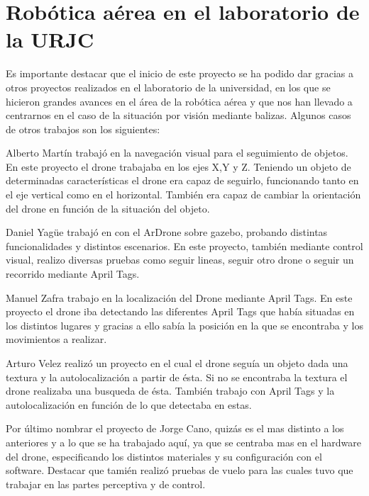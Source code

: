 	

\section{Rob\'otica a\'erea en el laboratorio de la URJC}
\hspace{1 cm} Es importante destacar que el inicio de este proyecto se ha podido dar gracias a otros proyectos realizados en el laboratorio de la universidad, en los que se hicieron grandes avances en el \'area de la rob\'otica a\'erea y que nos han llevado a centrarnos en el caso de la situaci\'on por visi\'on mediante balizas. Algunos casos de otros trabajos son los siguientes:

\hspace{1 cm} Alberto Mart\'in trabaj\'o en la navegaci\'on visual para el seguimiento de objetos. En este proyecto el drone trabajaba en los ejes X,Y y Z. Teniendo un objeto de determinadas caracter\'isticas el drone era capaz de seguirlo, funcionando tanto en el eje vertical como en el horizontal. Tambi\'en era capaz de cambiar la orientaci\'on del drone en funci\'on de la situaci\'on del objeto. 

\hspace{1 cm} Daniel Yag\"ue trabaj\'o en con el ArDrone sobre gazebo, probando distintas funcionalidades y distintos escenarios. En este proyecto, tambi\'en mediante control visual, realizo diversas pruebas como seguir lineas, seguir otro drone o seguir un recorrido mediante April Tags. 

\hspace{1 cm} Manuel Zafra trabajo en la localizaci\'on del Drone mediante April Tags. En este proyecto el drone iba detectando las diferentes April Tags que hab\'ia situadas en los distintos lugares y gracias a ello sab\'ia la posici\'on en la que se encontraba y los movimientos a realizar.  

\hspace{1 cm}Arturo Velez realiz\'o un proyecto en el cual el drone segu\'ia un objeto dada una textura y la autolocalizaci\'on a partir de \'esta. Si no se encontraba la textura el drone realizaba una busqueda de \'esta. Tambi\'en trabajo con April Tags y la autolocalizaci\'on en funci\'on de lo que detectaba en estas.

\hspace{1 cm} Por \'ultimo nombrar el proyecto de Jorge Cano, quiz\'as es el mas distinto a los anteriores y a lo que se ha trabajado aqu\'i, ya que se centraba mas en el hardware del drone, especificando los distintos materiales y su configuraci\'on con el software. Destacar que tami\'en realiz\'o pruebas de vuelo para las cuales tuvo que trabajar en las partes perceptiva y de control.

